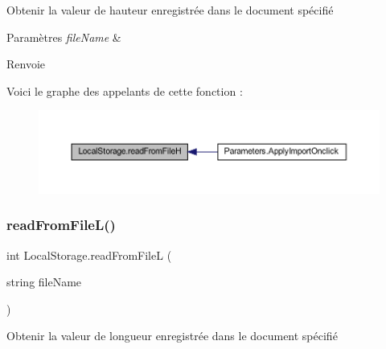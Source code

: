 Obtenir la valeur de hauteur enregistrée dans le document spécifié 


\begin{DoxyParams}{Paramètres}
{\em file\+Name} & \\
\hline
\end{DoxyParams}
\begin{DoxyReturn}{Renvoie}

\end{DoxyReturn}
Voici le graphe des appelants de cette fonction \+:\nopagebreak
\begin{figure}[H]
\begin{center}
\leavevmode
\includegraphics[width=350pt]{class_local_storage_ab0e31baa14b85dc8a8bd21aa1d53ab09_icgraph}
\end{center}
\end{figure}
\mbox{\label{class_local_storage_a2216bc871c8298023f62119bcdf7edb4}} 
\subsubsection{\texorpdfstring{read\+From\+File\+L()}{readFromFileL()}}
{\footnotesize\ttfamily int Local\+Storage.\+read\+From\+FileL (\begin{DoxyParamCaption}\item[{string}]{file\+Name }\end{DoxyParamCaption})\hspace{0.3cm}{\ttfamily [inline]}}



Obtenir la valeur de longueur enregistrée dans le document spécifié 


